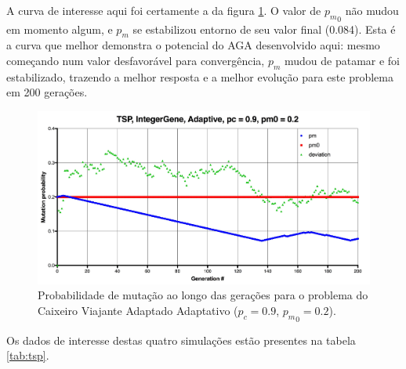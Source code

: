 A curva de interesse aqui foi certamente a da figura \ref{fig:tsp_02_adaptive_pm}. O valor de ${p_m}_0$ não mudou em momento algum, e $p_m$ se estabilizou entorno de seu valor final (0.084). Esta é a curva que melhor demonstra o potencial do AGA desenvolvido aqui: mesmo começando num valor desfavorável para convergência, $p_m$ mudou de patamar e foi estabilizado, trazendo a melhor resposta e a melhor evolução para este problema em 200 gerações.

\begin{figure}[ht!]
    \centering \includegraphics[width=1.0\textwidth]{tsp_02_adaptive_pm.jpg}
    \caption{Probabilidade de mutação ao longo das gerações para o problema do Caixeiro Viajante Adaptado Adaptativo ($p_c=0.9$, ${p_m}_0=0.2$).}
    \label{fig:tsp_02_adaptive_pm}
\end{figure}

Os dados de interesse destas quatro simulações estão presentes na tabela \ref{tab:tsp}.

